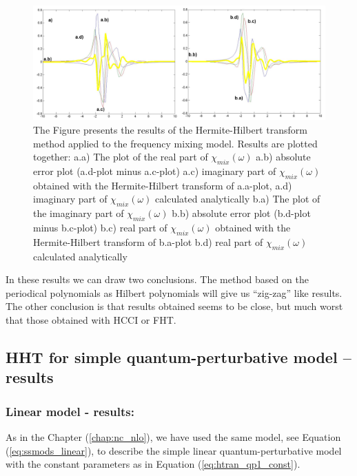 \documentclass[12pt,twoside,a4paper]{article}
\numberwithin{equation}{subsection}
\numberwithin{figure}{subsection}
\begin{document}
\begin{figure} 
  \includegraphics[width=150mm]{img/hht_fmix.png}
  \caption{The Figure presents the results of the Hermite-Hilbert transform method applied to the frequency mixing model. Results are plotted together:
     a.a) The plot of the real part of ${\chi_{mix}}(\omega )$
     a.b) absolute error plot (a.d-plot minus a.c-plot)
     a.c) imaginary part of ${\chi_{mix}}(\omega )$ obtained with the Hermite-Hilbert transform of a.a-plot, 
     a.d) imaginary part of ${\chi_{mix}}(\omega )$ calculated analytically 
     b.a) The plot of the imaginary part of ${\chi_{mix}}(\omega )$ 
     b.b) absolute error plot (b.d-plot minus b.c-plot)
     b.c) real part of ${\chi_{mix}}(\omega )$ obtained with the Hermite-Hilbert transform of b.a-plot  
     b.d) real part of $\chi_{mix} (\omega )$ calculated analytically 
     \label{fig:hht_fmix}
     }
\end{figure}

In these results we can draw two conclusions. The method based on the periodical polynomials as Hilbert polynomials will give us ``zig-zag'' like results. The other conclusion is that results obtained seems to be close, but much worst that those obtained with HCCI or FHT. 

\subsection{HHT for simple quantum-perturbative model -- results} \label{chap:hermite_quantum}

\subsubsection*{Linear model - results:}

As in the Chapter (\ref{chap:nc_nlo}), we have used the same model, see Equation (\ref{eq:ssmods_linear}), to describe the simple linear quantum-perturbative model with the constant parameters as in Equation (\ref{eq:htran_qp1_const}). 
\end{document}
